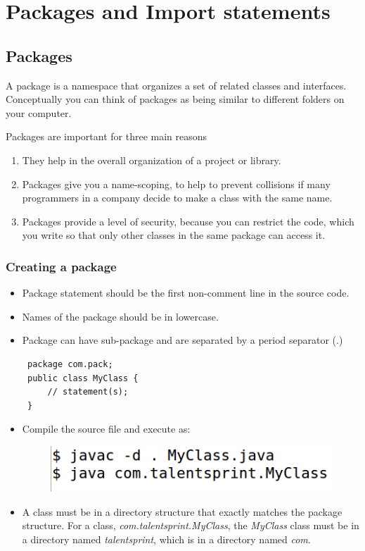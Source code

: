 \documentclass[11pt,a4paper]{article}
\author{TalentSprint}
\date{}
\begin{document}
\section*{Packages and Import statements}

\subsection*{Packages}
A package is a namespace that organizes a set of related classes and interfaces. Conceptually you can think of packages as being similar to different folders on your computer.
\begin{description}
 \item Packages are important for three main reasons
 \begin{enumerate}
  \item They help in the overall organization of a project or library.
  \item Packages give you a name-scoping, to help to prevent collisions if many programmers in a company decide to make a class with the same name.
  \item Packages provide a level of security, because you can restrict the code, which you write so that only other classes in the same package can access it.
 \end{enumerate}

\end{description}

\subsubsection*{Creating a package}
\begin{itemize}
 \item Package statement should be the first non-comment line in the source code.
 \item Names of the package should be in lowercase.
 \item Package can have sub-package and are separated by a period separator (.)
 \begin{lstlisting}
 package com.pack;
 public class MyClass {
     // statement(s);
 }
\end{lstlisting}
 \item Compile the source file and execute as:
 \begin{figure}[H] 
 \begin{center}
  \includegraphics[scale=.5]{package.png}
 \end{center}
 \end{figure}
 
 \item A class must be in a directory structure that exactly matches the package structure. For a class, \emph{com.talentsprint.MyClass}, the \emph{MyClass} class must be in a directory named \emph{talentsprint}, which is in a directory named \emph{com}.
\end{itemize}
\end{document}
